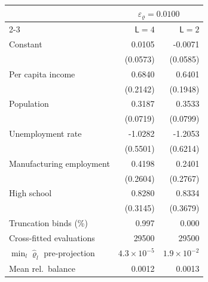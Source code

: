 \begin{tabular}{lrr}
\toprule
 & \multicolumn{2}{c}{$\varepsilon_\varrho = 0.0100$} \\
\cmidrule(lr){2-3}
 & $\mathsf L = 4$ & $\mathsf L = 2$ \\
\midrule
Constant & 0.0105 & -0.0071 \\
 & (0.0573) & (0.0585) \\
Per capita income & 0.6840 & 0.6401 \\
 & (0.2142) & (0.1948) \\
Population & 0.3187 & 0.3533 \\
 & (0.0719) & (0.0799) \\
Unemployment rate & -1.0282 & -1.2053 \\
 & (0.5501) & (0.6214) \\
Manufacturing employment & 0.4198 & 0.2401 \\
 & (0.2604) & (0.2767) \\
High school & 0.8280 & 0.8334 \\
 & (0.3145) & (0.3679) \\
\midrule
Truncation binds (\%) & 0.997 & 0.000 \\
Cross-fitted evaluations & 29500 & 29500 \\
$\min_l\hat\varrho_l$ pre-projection & $4.3 \times 10^{-5}$ & $1.9 \times 10^{-2}$ \\
Mean rel.\ balance & 0.0012 & 0.0013 \\
\bottomrule
\end{tabular}

